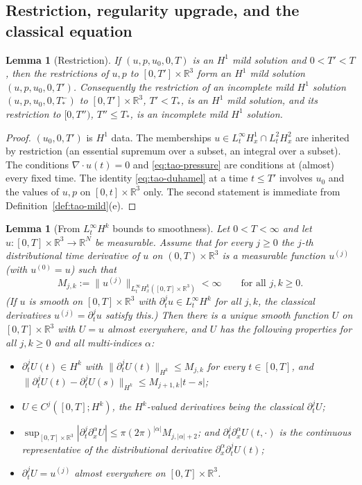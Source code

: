 \documentclass[11pt]{article}
\newtheorem{lemma}[theorem]{Lemma}
\theoremstyle{definition}
\theoremstyle{plain}
\newcommand{\R}{\mathbb R}
\newcommand{\norm}[1]{\lVert #1\rVert}
\begin{document}
\subsection{Restriction, regularity upgrade, and the classical equation}

\begin{lemma}[Restriction]\label{lem:restriction}
If $(u,p,u_0,0,T)$ is an $H^1$ mild solution and $0<T'<T$, then the
restrictions of $u,p$ to $[0,T']\times\R^3$ form an $H^1$ mild solution
$(u,p,u_0,0,T')$.  Consequently the restriction of an incomplete mild
$H^1$ solution $(u,p,u_0,0,T_*^-)$ to $[0,T']\times\R^3$, $T'<T_*$, is an
$H^1$ mild solution, and its restriction to $[0,T'')$, $T''\leq T_*$, is
an incomplete mild $H^1$ solution.
\end{lemma}

\begin{proof}
$(u_0,0,T')$ is $H^1$ data.  The memberships $u\in L^\infty_tH^1_x\cap
L^2_tH^2_x$ are inherited by restriction (an essential supremum over a
subset, an integral over a subset).  The conditions $\nabla\cdot u(t)=0$
and \eqref{eq:tao-pressure} are conditions at (almost) every fixed time.
The identity \eqref{eq:tao-duhamel} at a time $t\leq T'$ involves $u_0$
and the values of $u,p$ on $[0,t]\times\R^3$ only.  The second statement
is immediate from Definition~\ref{def:tao-mild}(e).
\end{proof}

\begin{lemma}[From $L^\infty_tH^k$ bounds to smoothness]\label{lem:upgrade}
Let $0<T<\infty$ and let $u:[0,T]\times\R^3\to\R^N$ be measurable.  Assume
that for every $j\geq0$ the $j$-th distributional time derivative of $u$
on $(0,T)\times\R^3$ is a measurable function $u^{(j)}$ (with
$u^{(0)}=u$) such that
\[
 M_{j,k}:=\norm{u^{(j)}}_{L^\infty_tH^k_x([0,T]\times\R^3)}<\infty
 \qquad\text{for all }j,k\geq0 .
\]
(If $u$ is smooth on $[0,T]\times\R^3$ with
$\partial_t^ju\in L^\infty_tH^k$ for all $j,k$, the classical derivatives
$u^{(j)}=\partial_t^ju$ satisfy this.)  Then there is a unique smooth
function $U$ on $[0,T]\times\R^3$ with $U=u$ almost everywhere, and $U$
has the following properties for all $j,k\geq0$ and all multi-indices
$\alpha$:
\begin{itemize}
\item[(a)] $\partial_t^jU(t)\in H^k$ with $\norm{\partial_t^jU(t)}_{H^k}
\leq M_{j,k}$ for every $t\in[0,T]$, and
$\norm{\partial_t^jU(t)-\partial_t^jU(s)}_{H^k}\leq M_{j+1,k}|t-s|$;
\item[(b)] $U\in C^j([0,T];H^k)$, the $H^k$-valued derivatives being the
classical $\partial_t^jU$;
\item[(c)] $\sup_{[0,T]\times\R^3}|\partial_t^j\partial_x^\alpha U|
\leq\pi(2\pi)^{|\alpha|}M_{j,|\alpha|+2}$; and
$\partial_t^j\partial_x^\alpha U(t,\cdot)$ is the continuous representative
of the distributional derivative $\partial_x^\alpha\partial_t^jU(t)$;
\item[(d)] $\partial_t^jU=u^{(j)}$ almost everywhere on $[0,T]\times\R^3$.
\end{itemize}
\end{lemma}
\end{document}
